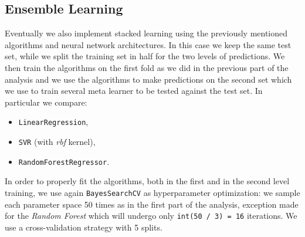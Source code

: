 \subsection{Ensemble Learning}
    Eventually we also implement stacked learning using the previously mentioned algorithms and neural network architectures. In this case we keep the same test set, while we split the training set in half for the two levels of predictions. We then train the algorithms on the first fold as we did in the previous part of the analysis and we use the algorithms to make predictions on the second set which we use to train several meta learner to be tested against the test set. In particular we compare:
    \begin{itemize}
        \item \texttt{LinearRegression},
        \item \texttt{SVR} (with \textit{rbf} kernel),
        \item \texttt{RandomForestRegressor}.
    \end{itemize}
    In order to properly fit the algorithms, both in the first and in the second level training, we use again \texttt{BayesSearchCV} as hyperparameter optimization: we sample each parameter space 50 times as in the first part of the analysis, exception made for the \textit{Random Forest} which will undergo only \texttt{int(50 / 3) = 16} iterations. We use a cross-validation strategy with 5 splits.
